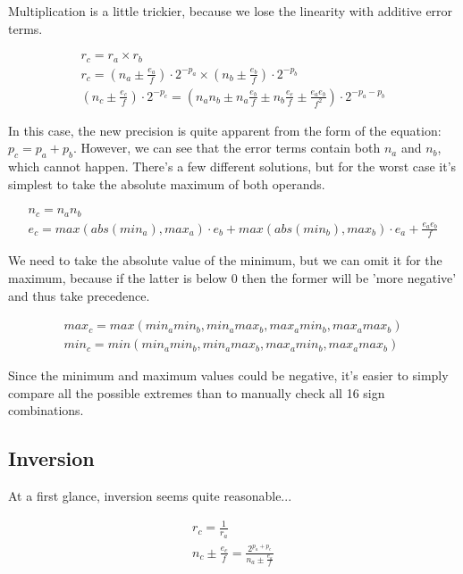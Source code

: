 \documentclass[10pt,a4paper]{article}
\numberwithin{equation}{section}
\numberwithin{equation}{subsection}
\begin{document}
	Multiplication is a little trickier, because we lose the linearity with additive error terms.
	
	\begin{eqnarray}
		r_c = r_a \times r_b \\
		r_c = (n_a \pm \frac{e_a}{f})\cdot 2^{-p_a} \times (n_b \pm \frac{e_b}{f})\cdot 2^{-p_b} \\
		(n_c \pm \frac{e_c}{f})\cdot 2^{-p_c} = ({n_a}{n_b} \pm {n_a}\frac{e_b}{f} \pm {n_b}\frac{e_e}{f} \pm \frac{{e_a}{e_b}}{f^2})\cdot 2^{-p_a-p_b}
	\end{eqnarray}
	
	In this case, the new precision is quite apparent from the form of the equation: $p_c = p_a + p_b$. However, we can see that the error terms contain both $n_a$ and $n_b$, which cannot happen. There's a few different solutions, but for the worst case it's simplest to take the absolute maximum of both operands.
	
	\begin{eqnarray}
		n_c = {n_a}{n_b} \\
		e_c = max(abs(min_a), max_a) \cdot e_b + max(abs(min_b), max_b) \cdot e_a + \frac{{e_a}{e_b}}{f}
	\end{eqnarray}
	
	We need to take the absolute value of the minimum, but we can omit it for the maximum, because if the latter is below 0 then the former will be 'more negative' and thus take precedence.
	
	\begin{eqnarray}
		max_c = max(min_a min_b, min_a max_b, max_a min_b, max_a max_b) \\
		min_c = min(min_a min_b, min_a max_b, max_a min_b, max_a max_b)
	\end{eqnarray}
	
	Since the minimum and maximum values could be negative, it's easier to simply compare all the possible extremes than to manually check all 16 sign combinations.
	
	\subsection{Inversion}
	
	At a first glance, inversion seems quite reasonable...
	
	\begin{eqnarray}
		r_c = \frac{1}{r_a} \\
		n_c \pm \frac{e_c}{f} = \frac{2^{p_a+p_c}}{n_a \pm \frac{e_a}{f}} 
	\end{eqnarray}
	
\end{document}
